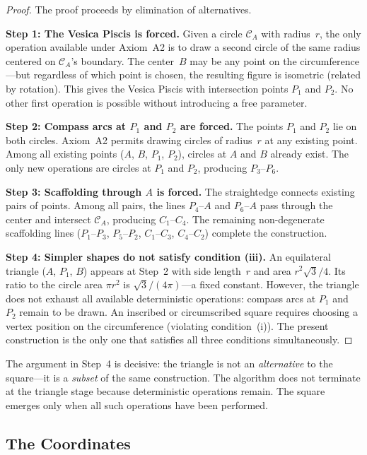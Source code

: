 \documentclass[12pt, a4paper]{article}
\begin{document}
\begin{proof}
The proof proceeds by elimination of alternatives.

\textbf{Step 1: The Vesica Piscis is forced.} Given a circle $\mathcal{C}_A$ with radius~$r$, the only operation available under Axiom~A2 is to draw a second circle of the same radius centered on $\mathcal{C}_A$'s boundary. The center~$B$ may be any point on the circumference---but regardless of which point is chosen, the resulting figure is isometric (related by rotation). This gives the Vesica Piscis with intersection points $P_1$ and $P_2$. No other first operation is possible without introducing a free parameter.

\textbf{Step 2: Compass arcs at $P_1$ and $P_2$ are forced.} The points $P_1$ and $P_2$ lie on both circles. Axiom~A2 permits drawing circles of radius~$r$ at any existing point. Among all existing points ($A$, $B$, $P_1$, $P_2$), circles at $A$ and $B$ already exist. The only new operations are circles at $P_1$ and $P_2$, producing $P_3$--$P_6$.

\textbf{Step 3: Scaffolding through $A$ is forced.} The straightedge connects existing pairs of points. Among all pairs, the lines $P_4$--$A$ and $P_6$--$A$ pass through the center and intersect $\mathcal{C}_A$, producing $C_1$--$C_4$. The remaining non-degenerate scaffolding lines ($P_1$--$P_3$, $P_5$--$P_2$, $C_1$--$C_3$, $C_4$--$C_2$) complete the construction.

\textbf{Step 4: Simpler shapes do not satisfy condition (iii).} An equilateral triangle ($A$, $P_1$, $B$) appears at Step~2 with side length~$r$ and area $r^2\sqrt{3}/4$. Its ratio to the circle area $\pi r^2$ is $\sqrt{3}/(4\pi)$---a fixed constant. However, the triangle does not exhaust all available deterministic operations: compass arcs at $P_1$ and $P_2$ remain to be drawn. An inscribed or circumscribed square requires choosing a vertex position on the circumference (violating condition~(i)). The present construction is the only one that satisfies all three conditions simultaneously.
\end{proof}

\noindent The argument in Step~4 is decisive: the triangle is not an \emph{alternative} to the square---it is a \emph{subset} of the same construction. The algorithm does not terminate at the triangle stage because deterministic operations remain. The square emerges only when all such operations have been performed.

\subsection{The Coordinates}
\end{document}
